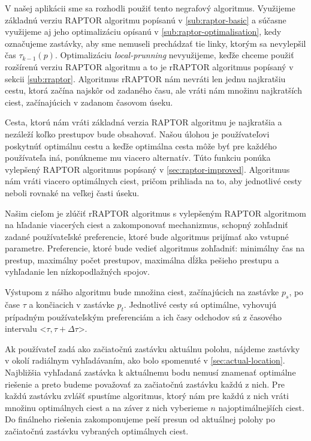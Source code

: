 V našej aplikácii sme sa rozhodli použiť tento negrafový algoritmus. Využijeme základnú verziu RAPTOR algoritmu popísanú v \ref{sub:raptor-basic} a súčasne využijeme aj jeho optimalizáciu opísanú v \ref{sub:raptor-optimalisation}, kedy označujeme zastávky, aby sme nemuseli prechádzať tie linky, ktorým sa nevylepšil čas $\tau_{k-1}(p)$. Optimalizáciu \textit{local-prunning} nevyužijeme, keďže chceme použiť rozšírenú verziu RAPTOR algoritmu a to je rRAPTOR algoritmus popísaný v sekcii \ref{sub:rraptor}. Algoritmus rRAPTOR nám nevráti len jednu najkratšiu cestu, ktorá začína najskôr od zadaného času, ale vráti nám množinu najkratších ciest, začínajúcich v zadanom časovom úseku.

Cesta, ktorú nám vráti základná verzia RAPTOR algoritmu je najkratšia a nezáleží koľko prestupov bude obsahovať. Našou úlohou je používateľovi poskytnúť optimálnu cestu a keďže optimálna cesta môže byť pre každého používateľa iná, ponúkneme mu viacero alternatív.  Túto funkciu ponúka vylepšený RAPTOR algoritmus popísaný v \ref{sec:raptor-improved}. Algoritmus nám vráti viacero optimálnych ciest, pričom prihliada na to, aby jednotlivé cesty neboli rovnaké na veľkej časti úseku.

Našim cieľom je zlúčiť rRAPTOR algoritmus s vylepšeným RAPTOR algoritmom na hľadanie viacerých ciest a zakomponovať mechanizmus, schopný zohľadniť zadané používateľské preferencie, ktoré bude algoritmus prijímať ako vstupné parametre. Preferencie, ktoré bude vedieť algoritmus zohľadniť: minimálny čas na prestup, maximálny počet prestupov, maximálna dĺžka pešieho prestupu a vyhľadanie len nízkopodlažných spojov. 

Výstupom z nášho algoritmu bude množina ciest, začínajúcich na zastávke $p_s$, po čase $\tau$ a končiacich v zastávke $p_t$. Jednotlivé cesty sú optimálne, vyhovujú prípadným používateľským preferenciám a ich časy odchodov sú z časového intervalu <$\tau, \tau + \Delta \tau$>. 

Ak používateľ zadá ako začiatočnú zastávku aktuálnu polohu, nájdeme zastávky v okolí radiálnym vyhľadávaním, ako bolo spomenuté v \ref{sec:actual-location}. Najbližšia vyhľadaná zastávka k aktuálnemu bodu nemusí znamenať optimálne riešenie a preto budeme považovať za začiatočnú zastávku každú z nich. Pre každú zastávku zvlášť spustíme algoritmus, ktorý nám pre každú z nich vráti množinu optimálnych ciest a na záver z nich vyberieme $n$ najoptimálnejších ciest. Do finálneho riešenia zakomponujeme peší presun od aktuálnej polohy po začiatočnú zastávku vybraných optimálnych ciest.

